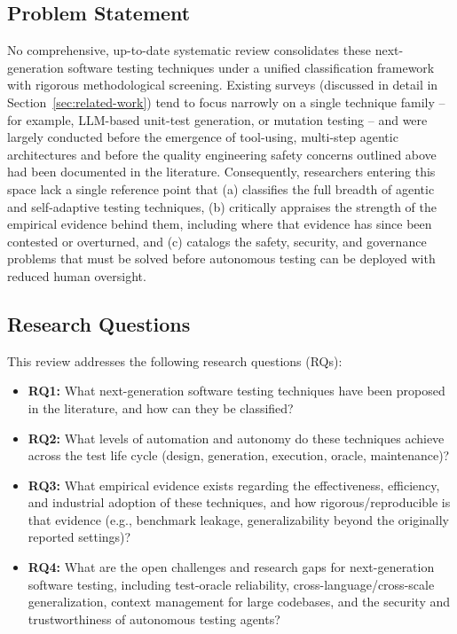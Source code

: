 \subsection{Problem Statement}
No comprehensive, up-to-date systematic review consolidates these
next-generation software testing techniques under a unified
classification framework with rigorous methodological screening.
Existing surveys (discussed in detail in
Section~\ref{sec:related-work}) tend to focus narrowly on a single
technique family -- for example, LLM-based unit-test generation, or
mutation testing -- and were largely conducted before the emergence of
tool-using, multi-step agentic architectures and before the quality
engineering safety concerns outlined above had been documented in the
literature. Consequently, researchers entering this space lack a
single reference point that (a) classifies the full breadth of
agentic and self-adaptive testing techniques, (b) critically appraises
the strength of the empirical evidence behind them, including where
that evidence has since been contested or overturned, and (c)
catalogs the safety, security, and governance problems that must be
solved before autonomous testing can be deployed with reduced human
oversight.

\subsection{Research Questions}
This review addresses the following research questions (RQs):
\begin{itemize}
  \item \textbf{RQ1:} What next-generation software testing techniques
        have been proposed in the literature, and how can they be
        classified?
  \item \textbf{RQ2:} What levels of automation and autonomy do these
        techniques achieve across the test life cycle (design,
        generation, execution, oracle, maintenance)?
  \item \textbf{RQ3:} What empirical evidence exists regarding the
        effectiveness, efficiency, and industrial adoption of these
        techniques, and how rigorous/reproducible is that evidence
        (e.g., benchmark leakage, generalizability beyond the
        originally reported settings)?
  \item \textbf{RQ4:} What are the open challenges and research gaps
        for next-generation software testing, including test-oracle
        reliability, cross-language/cross-scale generalization,
        context management for large codebases, and the security and
        trustworthiness of autonomous testing agents?
\end{itemize}

